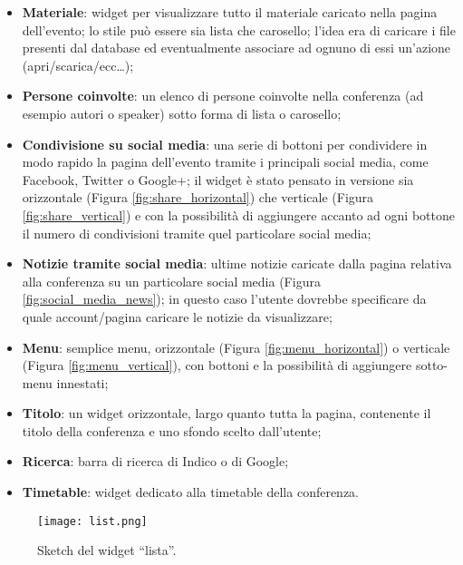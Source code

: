 \begin{itemize}
\begin{itemize}
                    \item \textbf{Materiale}: widget per visualizzare tutto il materiale caricato nella pagina dell'evento; lo stile può essere sia lista che carosello; l'idea era di caricare i file presenti dal database ed eventualmente associare ad ognuno di essi un'azione (apri/scarica/ecc\dots);
                    \item \textbf{Persone coinvolte}: un elenco di persone coinvolte nella conferenza (ad esempio autori o speaker) sotto forma di lista o carosello;
                    \item \textbf{Condivisione su social media}: una serie di bottoni per condividere in modo rapido la pagina dell'evento tramite i principali social media, come Facebook, Twitter o Google+; il widget è stato pensato in versione sia orizzontale (Figura \ref{fig:share_horizontal}) che verticale (Figura \ref{fig:share_vertical}) e con la possibilità di aggiungere accanto ad ogni bottone il numero di condivisioni tramite quel particolare social media;
                    \item \textbf{Notizie tramite social media}: ultime notizie caricate dalla pagina relativa alla conferenza su un particolare social media (Figura \ref{fig:social_media_news}); in questo caso l'utente dovrebbe specificare da quale account/pagina caricare le notizie da visualizzare;
                    \item \textbf{Menu}: semplice menu, orizzontale (Figura \ref{fig:menu_horizontal}) o verticale (Figura \ref{fig:menu_vertical}), con bottoni e la possibilità di aggiungere sotto-menu innestati;
                    \item \textbf{Titolo}: un widget orizzontale, largo quanto tutta la pagina, contenente il titolo della conferenza e uno sfondo scelto dall'utente;
                    \item \textbf{Ricerca}: barra di ricerca di Indico o di Google;
                    \item \textbf{Timetable}: widget dedicato alla timetable della conferenza.
                \end{itemize}
        \end{itemize}
        
       	\begin{figure}[h!]
       		\begin{center}
       			\texttt{[image: list.png]}
       		\end{center}
       		\caption[Sketch del widget ``lista'']{Sketch del widget ``lista''.}
       		\label{fig:list}
       	\end{figure}
       	
